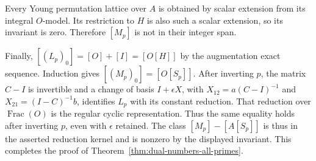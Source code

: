 Every Young permutation lattice over $A$ is obtained by scalar extension
from its integral $O$-model.  Its restriction to $H$ is also such a scalar
extension, so its invariant is zero.  Therefore $[M_p]$ is not in their
integer span.

Finally, $[(L_p)_0]=[O]+[I]=[O[H]]$ by the augmentation exact sequence.
Induction gives $[(M_p)_0]=[O[S_p]]$.  After inverting $p$, the matrix
$C-I$ is invertible and a change of basis $I+\epsilon X$, with
$X_{12}=a(C-I)^{-1}$ and $X_{21}=(I-C)^{-1}b$, identifies $L_p$ with its
constant reduction.  That reduction over $\operatorname{Frac}(O)$ is the regular
cyclic representation.  Thus the same equality holds after inverting
$p$, even with $\epsilon$ retained.  The class
$[M_p]-[A[S_p]]$ is thus in the asserted reduction kernel and is nonzero by
the displayed invariant.  This completes the proof of
Theorem~\ref{thm:dual-numbers-all-primes}.
